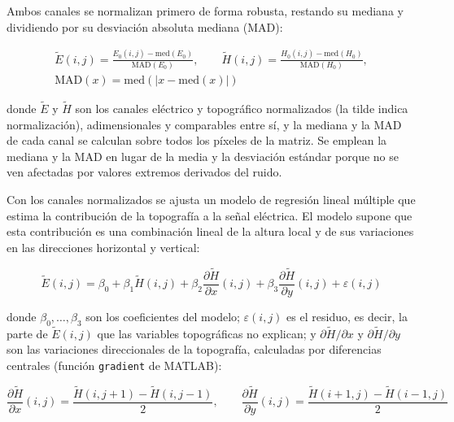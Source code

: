 Ambos canales se normalizan primero de forma robusta, restando su mediana y dividiendo por su desviación absoluta mediana (MAD):

\begin{equation}
\begin{gathered}
\tilde E(i,j) = \frac{E_0(i,j) - \mathrm{med}(E_0)}{\mathrm{MAD}(E_0)}, \qquad
\tilde H(i,j) = \frac{H_0(i,j) - \mathrm{med}(H_0)}{\mathrm{MAD}(H_0)}, \\[4pt]
\mathrm{MAD}(x) = \mathrm{med}\left(\left|x - \mathrm{med}(x)\right|\right)
\end{gathered}
\label{eq:norm_robusta}
\end{equation}

donde $\tilde E$ y $\tilde H$ son los canales eléctrico y topográfico normalizados (la tilde indica normalización), adimensionales y comparables entre sí, y la mediana y la MAD de cada canal se calculan sobre todos los píxeles de la matriz. Se emplean la mediana y la MAD en lugar de la media y la desviación estándar porque no se ven afectadas por valores extremos derivados del ruido.

Con los canales normalizados se ajusta un modelo de regresión lineal múltiple que estima la contribución de la topografía a la señal eléctrica. El modelo supone que esta contribución es una combinación lineal de la altura local y de sus variaciones en las direcciones horizontal y vertical:

\begin{equation}
\tilde E(i,j) = \beta_0 + \beta_1 \tilde H(i,j) + \beta_2 \frac{\partial \tilde H}{\partial x}(i,j) + \beta_3 \frac{\partial \tilde H}{\partial y}(i,j) + \varepsilon(i,j)
\label{eq:crosstalk}
\end{equation}

donde $\beta_0, \dots, \beta_3$ son los coeficientes del modelo; $\varepsilon(i,j)$ es el residuo, es decir, la parte de $\tilde E(i,j)$ que las variables topográficas no explican; y $\partial \tilde H/\partial x$ y $\partial \tilde H/\partial y$ son las variaciones direccionales de la topografía, calculadas por diferencias centrales (función \texttt{gradient} de MATLAB):

\begin{equation}
\frac{\partial \tilde H}{\partial x}(i,j) = \frac{\tilde H(i,j+1) - \tilde H(i,j-1)}{2}, \qquad
\frac{\partial \tilde H}{\partial y}(i,j) = \frac{\tilde H(i+1,j) - \tilde H(i-1,j)}{2}
\label{eq:diferencias}
\end{equation}

